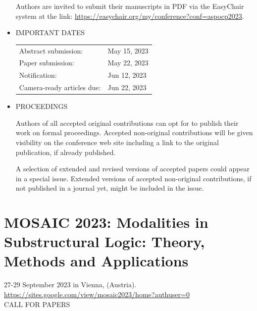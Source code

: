 \documentclass[prodmode,acmtecs]{acmsmall} %
\begin{document}
\begin{itemize}
 Authors are invited to submit their manuscripts in PDF via the EasyChair system at the link: \href{https://easychair.org/my/conference?conf=aspocp2023}{https://easychair.org/my/conference?conf=aspocp2023}. 
 
\item  IMPORTANT DATES   
 
\begin{tabulary}{\linewidth}{LL}Abstract submission:  & May 15, 2023 \\
Paper submission:  & May 22, 2023 \\
Notification:  & Jun 12, 2023 \\
Camera-ready articles due:  & Jun 22, 2023 \\
\end{tabulary}
 
\item  PROCEEDINGS 
 
  Authors of all accepted original contributions can opt for to publish their work on formal proceedings. Accepted non-original contributions will be given visibility on the conference web site including a link to the original publication, if already published. 
 
  A selection of extended and revised versions of accepted papers could appear in a special issue. Extended versions of accepted non-original contributions, if not published in a journal yet, might be included in the issue. 
 
\end{itemize}\section{MOSAIC 2023: Modalities in Substructural Logic: Theory, Methods and Applications}\label{MOSAIC2023}  27-29 September 2023 in Vienna, (Austria). \\ 
  \href{https://sites.google.com/view/mosaic2023/home?authuser=0}{https://sites.google.com/view/mosaic2023/home?authuser=0}\\ 
CALL FOR PAPERS 
\end{document}
